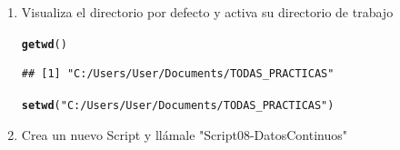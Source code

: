 \documentclass[12pt,letterpaper]{article}\usepackage[]{graphicx}\usepackage[]{color}
\makeatletter
\newcommand{\hlstr}[1]{\textcolor[rgb]{0.192,0.494,0.8}{#1}}%
\newcommand{\hlstd}[1]{\textcolor[rgb]{0.345,0.345,0.345}{#1}}%
\newcommand{\hlkwd}[1]{\textcolor[rgb]{0.737,0.353,0.396}{\textbf{#1}}}%
\newenvironment{kframe}{%
 \def\at@end@of@kframe{}%
 \ifinner\ifhmode%
  \def\at@end@of@kframe{\end{minipage}}%
  \begin{minipage}{\columnwidth}%
 \fi\fi%
 \def\FrameCommand##1{\hskip\@totalleftmargin \hskip-\fboxsep
 \colorbox{shadecolor}{##1}\hskip-\fboxsep
     \hskip-\linewidth \hskip-\@totalleftmargin \hskip\columnwidth}%
 \MakeFramed {\advance\hsize-\width
   \@totalleftmargin\z@ \linewidth\hsize
   \@setminipage}}%
 {\par\unskip\endMakeFramed%
 \at@end@of@kframe}
\newenvironment{knitrout}{}{} %
\makeatother
\begin{document}
\begin{enumerate}
  
\item Visualiza el directorio por defecto y activa su directorio de trabajo
\begin{knitrout}
\color{fgcolor}\begin{kframe}
\begin{alltt}
\hlkwd{getwd}\hlstd{()}
\end{alltt}
\begin{verbatim}
## [1] "C:/Users/User/Documents/TODAS_PRACTICAS"
\end{verbatim}
\begin{alltt}
\hlkwd{setwd}\hlstd{(}\hlstr{"C:/Users/User/Documents/TODAS_PRACTICAS"}\hlstd{)}
\end{alltt}
\end{kframe}
\end{knitrout}

\item Crea un nuevo Script y ll\'amale "Script08-DatosContinuos" 


\end{enumerate}
\end{document}
